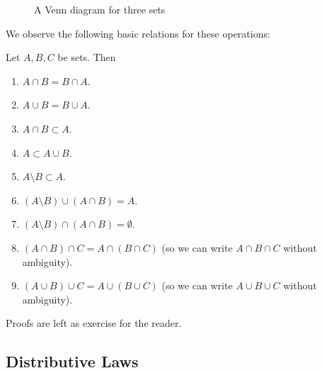 \begin{figure}[t]
\begin{center}
\end{center}
\caption{A Venn diagram for three sets}
\label{figvenndiag}
\end{figure}

We observe the following basic relations for these operations:
\begin{lemma}
Let $A,B,C$ be sets. Then
\begin{enumerate}
\item $A\cap B=B\cap A$.
\item $A\cup B=B\cup A$.
\item $A\cap B\subset A$.
\item $A\subset A\cup B$.
\item $A\setminus B\subset A$.
\item $(A\setminus B)\cup (A\cap B)=A$.
\item $(A\setminus B)\cap (A\cap B)=\emptyset$.
\item $(A\cap B)\cap C=A\cap (B\cap C)$ (so we can write $A\cap B\cap C$
without ambiguity).
\item $(A\cup B)\cup C=A\cup (B\cup C)$ (so we can write $A\cup B\cup C$
without ambiguity).
\end{enumerate}
\end{lemma}
Proofs are left as exercise for the reader.

\subsection{Distributive Laws}

